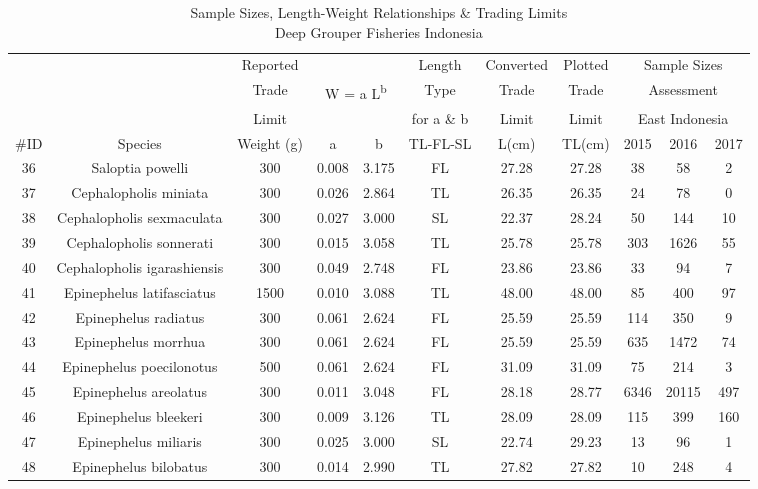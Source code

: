\documentclass{report}\usepackage[]{graphicx}\usepackage[]{color}
\begin{document}
\begin{table}[ht]
\centering
\caption{Sample Sizes, Length-Weight Relationships \& Trading Limits \\Deep Grouper Fisheries Indonesia} 
{\small
\begin{tabular}{ccccccccccc}
  \hline
  { } & { } & {Reported} & { } & { } & {Length} & {Converted} & {Plotted} & \multicolumn{3}{c}{Sample Sizes}\\
      { } & { } & {Trade} & \multicolumn{2}{c}{ W = a L\textsuperscript{b}} & {Type} & {Trade} & {Trade} & \multicolumn{3}{c}{Assessment}\\
      { } & { } & {Limit} & { } & { } & {for a \& b} & {Limit} & {Limit} & \multicolumn{3}{c}{East Indonesia}\\
      {\#ID} & {Species} & {Weight (g)} & {a} & {b} & {TL-FL-SL} & {L(cm)} & {TL(cm)} & {2015} & {2016} & {2017}\\ \hline
36 & Saloptia powelli & 300 & 0.008 & 3.175 & FL & 27.28 & 27.28 & 38 & 58 & 2 \\ 
  37 & Cephalopholis miniata & 300 & 0.026 & 2.864 & TL & 26.35 & 26.35 & 24 & 78 & 0 \\ 
  38 & Cephalopholis sexmaculata & 300 & 0.027 & 3.000 & SL & 22.37 & 28.24 & 50 & 144 & 10 \\ 
  39 & Cephalopholis sonnerati & 300 & 0.015 & 3.058 & TL & 25.78 & 25.78 & 303 & 1626 & 55 \\ 
  40 & Cephalopholis igarashiensis & 300 & 0.049 & 2.748 & FL & 23.86 & 23.86 & 33 & 94 & 7 \\ 
  41 & Epinephelus latifasciatus & 1500 & 0.010 & 3.088 & TL & 48.00 & 48.00 & 85 & 400 & 97 \\ 
  42 & Epinephelus radiatus & 300 & 0.061 & 2.624 & FL & 25.59 & 25.59 & 114 & 350 & 9 \\ 
  43 & Epinephelus morrhua & 300 & 0.061 & 2.624 & FL & 25.59 & 25.59 & 635 & 1472 & 74 \\ 
  44 & Epinephelus poecilonotus & 500 & 0.061 & 2.624 & FL & 31.09 & 31.09 & 75 & 214 & 3 \\ 
  45 & Epinephelus areolatus & 300 & 0.011 & 3.048 & FL & 28.18 & 28.77 & 6346 & 20115 & 497 \\ 
  46 & Epinephelus bleekeri & 300 & 0.009 & 3.126 & TL & 28.09 & 28.09 & 115 & 399 & 160 \\ 
  47 & Epinephelus miliaris & 300 & 0.025 & 3.000 & SL & 22.74 & 29.23 & 13 & 96 & 1 \\ 
  48 & Epinephelus bilobatus & 300 & 0.014 & 2.990 & TL & 27.82 & 27.82 & 10 & 248 & 4 \\ 

\end{tabular}}
\end{table}
\end{document}
